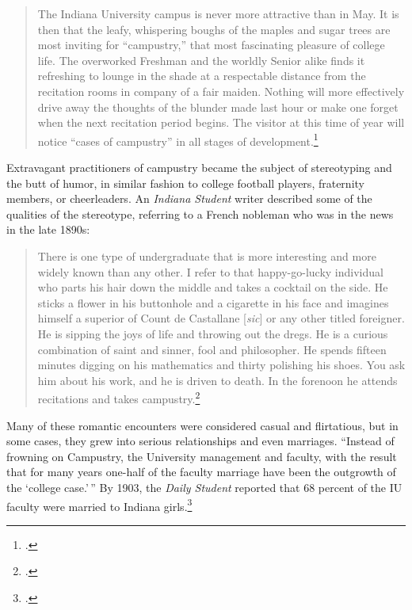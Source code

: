 \documentclass[
  american,
  letterpaper,
]{scrreprt}
\begin{document}
\begin{quote}
The Indiana University campus is never more attractive than in May. It
is then that the leafy, whispering boughs of the maples and sugar trees
are most inviting for ``campustry,'' that most fascinating pleasure of
college life. The overworked Freshman and the worldly Senior alike finds
it refreshing to lounge in the shade at a respectable distance from the
recitation rooms in company of a fair maiden. Nothing will more
effectively drive away the thoughts of the blunder made last hour or
make one forget when the next recitation period begins. The visitor at
this time of year will notice ``cases of campustry'' in all stages of
development.\footnote{.}
\end{quote}

Extravagant practitioners of campustry became the subject of
stereotyping and the butt of humor, in similar fashion to college
football players, fraternity members, or cheerleaders. An \emph{Indiana
Student} writer described some of the qualities of the stereotype,
referring to a French nobleman who was in the news in the late 1890s:

\begin{quote}
There is one type of undergraduate that is more interesting and more
widely known than any other. I refer to that happy-go-lucky individual
who parts his hair down the middle and takes a cocktail on the side. He
sticks a flower in his buttonhole and a cigarette in his face and
imagines himself a superior of Count de Castallane {[}\emph{sic}{]} or
any other titled foreigner. He is sipping the joys of life and throwing
out the dregs. He is a curious combination of saint and sinner, fool and
philosopher. He spends fifteen minutes digging on his mathematics and
thirty polishing his shoes. You ask him about his work, and he is driven
to death. In the forenoon he attends recitations and takes
campustry.\footnote{.}
\end{quote}

Many of these romantic encounters were considered casual and
flirtatious, but in some cases, they grew into serious relationships and
even marriages. ``Instead of frowning on Campustry, the University
management and faculty, with the result that for many years one-half of
the faculty marriage have been the outgrowth of the `college case.'\,''
By 1903, the \emph{Daily Student} reported that 68 percent of the IU
faculty were married to Indiana girls.\footnote{.}
\end{document}
